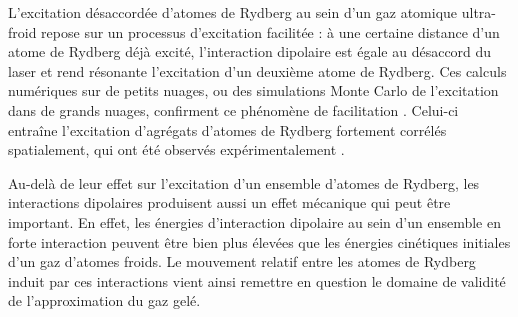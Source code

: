 L'excitation désaccordée d'atomes de Rydberg au sein d'un gaz atomique ultra-froid repose sur un processus d'\og excitation facilitée \fg{} :
à une certaine distance d'un atome de Rydberg déjà excité, l'interaction dipolaire est égale au désaccord du laser et rend résonante l'excitation d'un deuxième atome de Rydberg.
Ces calculs numériques sur de petits nuages, ou des simulations Monte Carlo de l'excitation dans de grands nuages, confirment ce phénomène de facilitation \cite{Robicheaux2005,Rost2007a,Evers2013,Cote2010}.
Celui-ci entraîne l'excitation d'agrégats d'atomes de Rydberg fortement corrélés spatialement, qui ont été observés expérimentalement \cite{Weidemueller2013,Pillet2012}.

Au-delà de leur effet sur l'excitation d'un ensemble d'atomes de Rydberg, les interactions dipolaires produisent aussi un effet mécanique qui peut être important.
En effet, les énergies d'interaction dipolaire au sein d'un ensemble en forte interaction peuvent être bien plus élevées que les énergies cinétiques initiales d'un gaz d'atomes froids.
Le mouvement relatif entre les atomes de Rydberg induit par ces interactions vient ainsi remettre en question le domaine de validité de l'approximation du gaz gelé.


